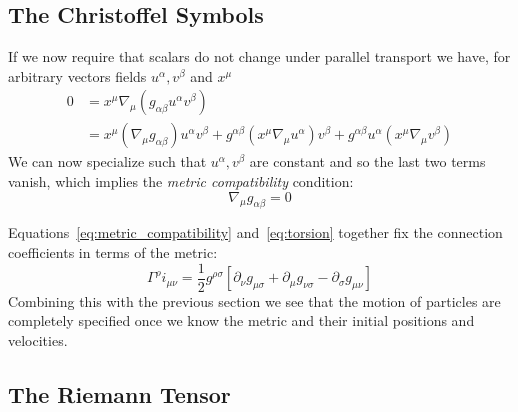 \subsection{The Christoffel Symbols}

If we now require that scalars do not change under parallel transport
we have, for arbitrary vectors fields $u^\alpha, v^\beta$ and $x^\mu$
%
\begin{align*}
0 &= x^\mu \nabla_\mu (g_{\alpha\beta} u^\alpha v^\beta) \\
&= x^\mu (\nabla_\mu g_{\alpha\beta}) u^\alpha v^\beta
+ g^{\alpha\beta} (x^\mu \nabla_\mu u^\alpha) v^\beta
+ g^{\alpha\beta} u^\alpha (x^\mu \nabla_\mu v^\beta)
\end{align*}
%
We can now specialize such that $u^\alpha, v^\beta$ are constant
and so the last two terms vanish, which implies the  \emph{metric
compatibility} condition:
%
\begin{equation}
\label{eq:metric_compatibility}
\nabla_\mu g_{\alpha\beta} = 0
\end{equation}

Equations~\ref{eq:metric_compatibility} and~\ref{eq:torsion} together
fix the connection coefficients in terms of the metric:
%
\begin{equation}
\Gamma^{\rho}i_{\mu\nu}
= \frac{1}{2} g^{\rho\sigma}\left[
\partial_\nu g_{\mu\sigma}
+ \partial_\mu g_{\nu\sigma}
- \partial_\sigma g_{\mu\nu}
\right]
\end{equation}
% 
Combining this with the previous section we see that the motion of
particles are completely specified once we know the metric and their
initial positions and velocities.

\subsection{The Riemann Tensor}

